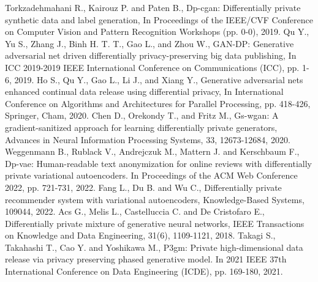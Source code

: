 \documentclass[conference]{IEEEtran}
\begin{document}
\begin{thebibliography}{00}
 Torkzadehmahani R., Kairouz P. and Paten B., Dp-cgan: Differentially private synthetic data and label generation, In Proceedings of the IEEE/CVF Conference on Computer Vision and Pattern Recognition Workshops (pp. 0-0), 2019.
 Qu Y., Yu S., Zhang J., Binh H. T. T., Gao L., and Zhou W., GAN-DP: Generative adversarial net driven differentially privacy-preserving big data publishing, In ICC 2019-2019 IEEE International Conference on Communications (ICC), pp. 1-6, 2019.
 Ho S., Qu Y., Gao L., Li J., and Xiang Y., Generative adversarial nets enhanced continual data release using differential privacy, In International Conference on Algorithms and Architectures for Parallel Processing, pp. 418-426, Springer, Cham, 2020.
 Chen D., Orekondy T., and Fritz M., Gs-wgan: A gradient-sanitized approach for learning differentially private generators, Advances in Neural Information Processing Systems, 33, 12673-12684, 2020.
 Weggenmann B., Rublack V., Andrejczuk M., Mattern J. and Kerschbaum F., Dp-vae: Human-readable text anonymization for online reviews with differentially private variational autoencoders. In Proceedings of the ACM Web Conference 2022, pp. 721-731, 2022.
 Fang L., Du B. and Wu C., Differentially private recommender system with variational autoencoders, Knowledge-Based Systems, 109044, 2022.
 Acs G., Melis L., Castelluccia C. and De Cristofaro E., Differentially private mixture of generative neural networks, IEEE Transactions on Knowledge and Data Engineering, 31(6), 1109-1121, 2018.
 Takagi S., Takahashi T., Cao Y. and Yoshikawa M., P3gm: Private high-dimensional data release via privacy preserving phased generative model. In 2021 IEEE 37th International Conference on Data Engineering (ICDE), pp. 169-180, 2021.

\end{thebibliography}
\end{document}

